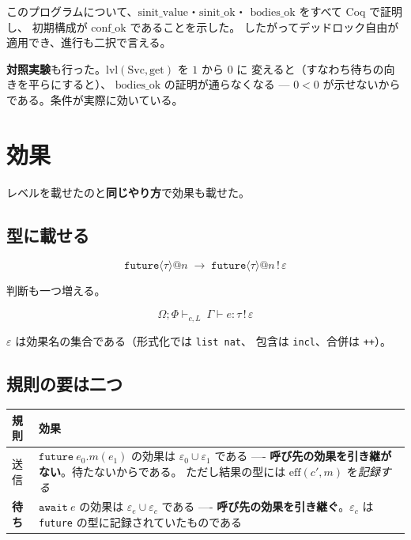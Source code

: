 \documentclass[11pt,a4paper]{ltjsarticle}
\makeatletter
\theoremstyle{definition}
\theoremstyle{remark}
\newcommand{\Om}{\Omega}
\newcommand{\Ph}{\Phi}
\newcommand{\meff}{\mathrm{eff}}
\newcommand{\confok}{\mathrm{conf\_ok}}
\newcommand{\tfutl}[2]{\ensuremath{\mathtt{future}\langle #1 \rangle @ #2}}
\newcommand{\lvl}{\mathrm{lvl}}
\makeatother
\begin{document}
このプログラムについて、$\mathrm{sinit\_value}$・$\mathrm{sinit\_ok}$・
$\mathrm{bodies\_ok}$ をすべて Coq で証明し、
初期構成が $\confok$ であることを示した。
したがってデッドロック自由が適用でき、進行も二択で言える。

\textbf{対照実験}も行った。$\lvl(\mathrm{Svc},\mathrm{get})$ を $1$ から $0$ に
変えると（すなわち待ちの向きを平らにすると）、
$\mathrm{bodies\_ok}$ の証明が通らなくなる ---
$0 < 0$ が示せないからである。条件が実際に効いている。

\section{効果}
\label{sec:effects}

レベルを載せたのと\textbf{同じやり方}で効果も載せた。

\subsection{型に載せる}

\[
\tfutl{\tau}{n} \;\longrightarrow\;
\mathtt{future}\langle \tau \rangle @ n \,!\, \varepsilon
\]

判断も一つ増える。

\[
\Om;\Ph \vdash_{c,L}\ \Gamma \vdash e : \tau \,!\, \varepsilon
\]

$\varepsilon$ は効果名の集合である（形式化では \texttt{list nat}、
包含は \texttt{incl}、合併は \texttt{++}）。

\subsection{規則の要は二つ}

\begin{center}
\small
\begin{tabular}{@{}lp{8.6cm}@{}}
\toprule
規則 & 効果 \\
\midrule
送信 & $\mathtt{future}\ e_0.m(e_1)$ の効果は
  $\varepsilon_0 \cup \varepsilon_1$ である ----
  \textbf{呼び先の効果を引き継がない}。待たないからである。
  ただし結果の型には $\meff(c',m)$ を\emph{記録する} \\
\addlinespace
\textbf{待ち} & $\mathtt{await}\ e$ の効果は
  $\varepsilon_e \cup \varepsilon_c$ である ----
  \textbf{呼び先の効果を引き継ぐ}。$\varepsilon_c$ は
  \texttt{future} の型に記録されていたものである \\
\bottomrule
\end{tabular}
\end{center}
\end{document}
